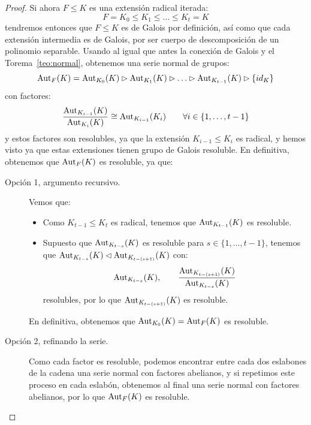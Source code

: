 \begin{lema}
\begin{proof}
        \noindent
        Si ahora $F\leq K$ es una extensión radical iterada:
        \begin{equation*}
            F=K_0\leq K_1 \leq \ldots \leq K_t = K
        \end{equation*}
        tendremos entonces que $F\leq K$ es de Galois por definición, así como que cada extensión intermedia es de Galois, por ser cuerpo de descomposición de un polinomio separable. Usando al igual que antes la conexión de Galois y el Torema~\ref{teo:normal}, obtenemos una serie normal de grupos:
        \begin{equation*}
            \operatorname{Aut}_F(K) = \operatorname{Aut}_{K_0}(K) \rhd \operatorname{Aut}_{K_1}(K) \rhd \ldots \rhd \operatorname{Aut}_{K_{t-1}}(K) \rhd \{id_K\}
        \end{equation*}
        con factores:
        \begin{equation*}
            \frac{\operatorname{Aut}_{K_{i-1}}(K)}{\operatorname{Aut}_{K_i}(K)} \cong \operatorname{Aut}_{K_{i-1}}(K_i) \qquad \forall i \in \{1,\ldots,t-1\}
        \end{equation*}
        y estos factores son resolubles, ya que la extensión $K_{i-1}\leq K_i$ es radical, y hemos visto ya que estas extensiones tienen grupo de Galois resoluble. En definitiva, obtenemos que $\operatorname{Aut}_F(K)$ es resoluble, ya que: 
        \begin{description}
            \item [Opción 1, argumento recursivo.] Vemos que:
                \begin{itemize}
                    \item Como $K_{t-1}\leq K_t$ es radical, tenemos que $\operatorname{Aut}_{K_{t-1}}(K)$ es resoluble.
                    \item Supuesto que $\operatorname{Aut}_{K_{t-s}}(K)$ es resoluble para $s \in \{1,\ldots,t-1\}$, tenemos que $\operatorname{Aut}_{K_{t-s}}(K)\lhd \operatorname{Aut}_{K_{t-(s+1)}}(K)$ con:
                        \begin{equation*}
                            \operatorname{Aut}_{K_{t-s}}(K), \qquad \frac{\operatorname{Aut}_{K_{t-(s+1)}}(K)}{\operatorname{Aut}_{K_{t-s}}(K)}
                        \end{equation*}
                        resolubles, por lo que $\operatorname{Aut}_{K_{t-(s+1)}}(K)$ es resoluble.
                \end{itemize}
                En definitiva, obtenemos que $\operatorname{Aut}_{K_{0}}(K) = \operatorname{Aut}_F(K)$ es resoluble.
            \item [Opción 2, refinando la serie.] Como cada factor es resoluble, podemos encontrar entre cada dos eslabones de la cadena una serie normal con factores abelianos, y si repetimos este proceso en cada eslabón, obtenemos al final una serie normal con factores abelianos, por lo que $\operatorname{Aut}_F(K)$ es resoluble.
        \end{description}
    \end{proof}
\end{lema}

